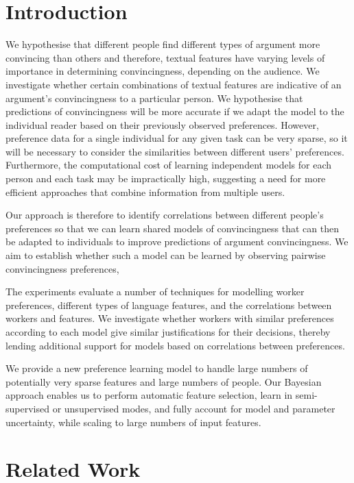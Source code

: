 \section{Introduction}\label{sec:intro}

We hypothesise that different people find different types of argument more convincing 
than others and therefore, 
textual features have varying levels of importance in determining convincingness, 
depending on the audience. 
We investigate whether certain combinations of textual features are indicative of an argument's convincingness to a particular person.
We hypothesise that predictions of convincingness will be more accurate if we adapt the model to the individual reader based on their previously observed preferences. 
However, preference data for a single individual for any given task can be very sparse, 
so it will be necessary to consider the similarities between different users' preferences.
Furthermore, the  computational cost of learning independent models for each person and each task may be
impractically high, suggesting a need for more efficient approaches that combine information from multiple users.

Our approach is therefore to identify correlations between different people's preferences
so that we can learn shared models of convincingness that can then be adapted to individuals to improve predictions of argument convincingness. 
We aim to establish whether such a model can be learned by observing pairwise convincingness preferences, 

The experiments evaluate a number of techniques for modelling worker preferences, different types of language features, and the correlations between workers and features. 
We investigate whether workers with similar preferences according to each model give similar justifications for their decisions, thereby lending additional support for models based on correlations between preferences.

We provide a new preference learning model to handle large numbers of potentially very sparse features and large numbers of people. Our Bayesian approach enables us to 
perform automatic feature selection, learn in semi-supervised or unsupervised modes, 
and fully account for model and parameter uncertainty, while scaling to large numbers of input features. 

\section{Related Work}\label{sec:related}

